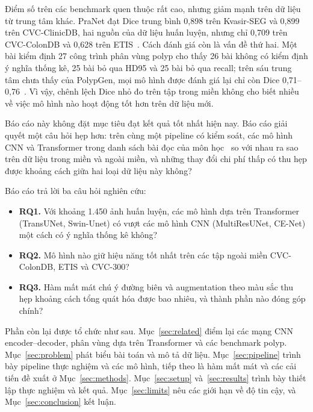 \documentclass[10pt,twoside]{article}
\begin{document}
Điểm số trên các benchmark quen thuộc rất cao, nhưng giảm mạnh trên dữ liệu từ
trung tâm khác. PraNet đạt Dice trung bình 0,898 trên Kvasir-SEG và 0,899 trên
CVC-ClinicDB, hai nguồn của dữ liệu huấn luyện, nhưng chỉ 0,709 trên CVC-ColonDB và
0,628 trên ETIS~\cite{fan2020pranet}. Cách đánh giá còn là vấn đề thứ hai. Một bài
kiểm định 27 công trình phân vùng polyp cho thấy 26 bài không có kiểm định ý nghĩa
thống kê, 25 bài bỏ qua HD95 và 25 bài bỏ qua recall; trên sáu trung tâm chưa thấy
của PolypGen, mọi mô hình được đánh giá lại chỉ còn Dice
0,71--0,76~\cite{urooj2026audit}. Vì vậy, chênh lệch Dice nhỏ đo trên tập trong miền
không cho biết nhiều về việc mô hình nào hoạt động tốt hơn trên dữ liệu mới.

Báo cáo này không đặt mục tiêu đạt kết quả tốt nhất hiện nay. Báo cáo giải quyết một
câu hỏi hẹp hơn: trên cùng một pipeline có kiểm soát, các mô hình CNN và Transformer
trong danh sách bài đọc của môn
học~\cite{ronneberger2015unet,chen2021transunet,cao2022swinunet,ibtehaz2020multiresunet,gu2019cenet,isensee2018nnunet}
so với nhau ra sao trên dữ liệu trong miền và ngoài miền, và những thay đổi chi phí
thấp có thu hẹp được khoảng cách giữa hai loại dữ liệu này không?

Báo cáo trả lời ba câu hỏi nghiên cứu:
\begin{itemize}
  \item \textbf{RQ1.} Với khoảng 1.450 ảnh huấn luyện, các mô hình dựa trên
  Transformer (TransUNet, Swin-Unet) có vượt các mô hình CNN (MultiResUNet, CE-Net)
  một cách có ý nghĩa thống kê không?
  \item \textbf{RQ2.} Mô hình nào giữ hiệu năng tốt nhất trên các tập ngoài miền
  CVC-ColonDB, ETIS và CVC-300?
  \item \textbf{RQ3.} Hàm mất mát chú ý đường biên và augmentation theo màu sắc thu
  hẹp khoảng cách tổng quát hóa được bao nhiêu, và thành phần nào đóng góp chính?
\end{itemize}

Phần còn lại được tổ chức như sau. Mục~\ref{sec:related} điểm lại các mạng CNN
encoder--decoder, phân vùng dựa trên Transformer và các benchmark polyp.
Mục~\ref{sec:problem} phát biểu bài toán và mô tả dữ liệu. Mục~\ref{sec:pipeline}
trình bày pipeline thực nghiệm và các mô hình, tiếp theo là hàm mất mát và các cải
tiến đề xuất ở Mục~\ref{sec:methods}. Mục~\ref{sec:setup} và~\ref{sec:results}
trình bày thiết lập thực nghiệm và kết quả. Mục~\ref{sec:limits} nêu các giới hạn
về độ tin cậy, và Mục~\ref{sec:conclusion} kết luận.
\end{document}
